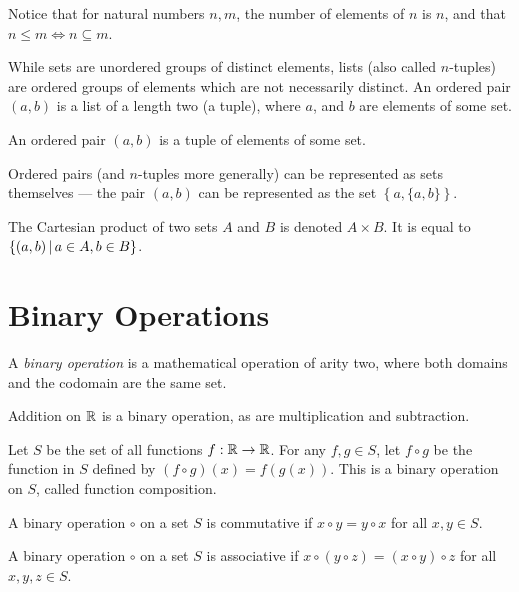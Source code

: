 Notice that for natural numbers $n, m$, the number of elements of $n$ is $n$, and that $n \leq m \iff n \subseteq m$.

While sets are unordered groups of distinct elements, lists (also called $n$-tuples) are ordered groups of elements which are not necessarily distinct. An ordered pair $(a, b)$ is a list of a length two (a tuple), where $a$, and $b$ are elements of some set.

\begin{defn}\label{tuple}
    An ordered pair $(a, b)$ is a tuple of elements of some set.
\end{defn}

Ordered pairs (and $n$-tuples more generally) can be represented as sets themselves --- the pair $(a, b)$ can be represented as the set $\left\{a, \{a, b\}\right\}$.

\begin{defn}\label{cartesian-product}
    The Cartesian product of two sets $A$ and $B$ is denoted $A \times B$. It is equal to $\left\{\left(a, b\right) \,\middle|\, a \in A, b \in B \right\}$.
\end{defn}

\section{Binary Operations}

\begin{defn}
    A \emph{binary operation} is a mathematical operation of arity two, where both domains and the codomain are the same set.
\end{defn}

\begin{exmp}
    Addition on $\mathbb{R}$ is a binary operation, as are multiplication and subtraction.
\end{exmp}

\begin{exmp}
    Let $S$ be the set of all functions $f : \mathbb{R} \to \mathbb{R}$. For any $f, g \in S$, let $f \circ g$ be the function in $S$ defined by $(f \circ g)(x) = f(g(x))$. This is a binary operation on $S$, called function composition.
\end{exmp}

\begin{defn}
    A binary operation $\circ$ on a set $S$ is commutative if $x \circ y = y \circ x$ for all $x, y \in S$.
\end{defn}

\begin{defn}
    A binary operation $\circ$ on a set $S$ is associative if $x \circ (y \circ z) = (x \circ y) \circ z$ for all $x, y, z \in S$.
\end{defn}

